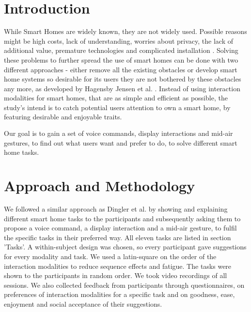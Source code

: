 \documentclass[sigchi]{acmart}
\begin{document}


\maketitle

\section{Introduction}
While Smart Homes are widely known, they are not widely used. Possible reasons might be high costs, lack of understanding, worries about privacy, the lack of additional value, premature technologies and complicated installation \cite{.}. Solving these problems to further spread the use of smart homes can be done with two different approaches - either remove all the existing obstacles or develop smart home systems so desirable for its users they are not bothered by these obstacles any more, as developed by Hagensby Jensen et al. \cite{Jensen.2018}. Instead of using interaction modalities for smart homes, that are as simple and efficient as possible, the study's intend is to catch potential users attention to own a smart home, by featuring desirable and enjoyable traits.

Our goal is to gain a set of voice commands, display interactions and mid-air gestures, to find out what users want and prefer to do, to solve different smart home tasks.

\section{Approach and Methodology}
We followed a similar approach as Dingler et al. \cite{Dingler.2018} by showing and explaining different smart home tasks to the participants and subsequently asking them to propose a voice command, a display interaction and a mid-air gesture, to fulfil the specific tasks in their preferred way. All eleven tasks are listed in section 'Tasks'. A within-subject design was chosen, so every participant gave suggestions for every modality and task. We used a latin-square on the order of the interaction modalities to reduce sequence effects \cite{.2017} and fatigue. The tasks were shown to the participants in  random order. We took video recordings of all sessions. We also collected feedback from participants through questionnaires, on preferences of interaction modalities for a specific task and on goodness, ease, enjoyment and social acceptance of their suggestions.
\end{document}

